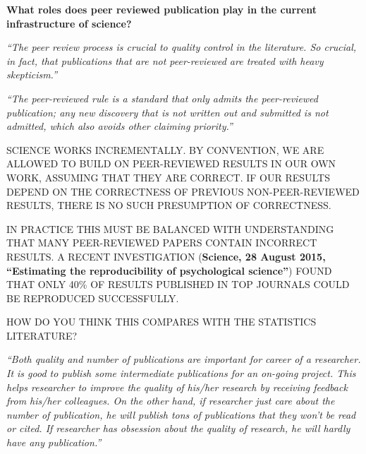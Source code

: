 \documentclass[portrait,11pt]{seminar}
\begin{document}

\es
\bs
{\bf  What roles does peer reviewed publication play in the current infrastructure of science? }

{\it ``The peer review process is crucial to quality control in the literature. So crucial, in fact, that publications that are not peer-reviewed are treated with heavy skepticism.''}

\medskip

{\it ``The peer-reviewed rule is a standard that only admits the peer-reviewed publication; any new discovery that is not written out and submitted is not admitted, which also avoids other claiming priority.''}


\es
\bs

SCIENCE WORKS INCREMENTALLY. BY CONVENTION, WE ARE ALLOWED TO BUILD ON PEER-REVIEWED RESULTS IN OUR OWN WORK, ASSUMING THAT THEY ARE CORRECT. IF OUR RESULTS DEPEND ON THE CORRECTNESS OF PREVIOUS NON-PEER-REVIEWED RESULTS, THERE IS NO SUCH PRESUMPTION OF CORRECTNESS.

\medskip

IN PRACTICE THIS MUST BE BALANCED WITH UNDERSTANDING THAT MANY PEER-REVIEWED PAPERS CONTAIN INCORRECT RESULTS.
A RECENT  INVESTIGATION ({\bf Science, 28 August 2015, ``Estimating the reproducibility of psychological science''}) FOUND THAT ONLY 40\% OF RESULTS PUBLISHED IN TOP JOURNALS COULD BE REPRODUCED SUCCESSFULLY.

\medskip

HOW DO YOU THINK THIS COMPARES WITH THE STATISTICS LITERATURE?

\es 
{}

{\it ``Both quality and number of publications are important for career of a researcher. It is good to publish some intermediate publications for an on-going project. This helps researcher to improve the quality of his/her research by receiving feedback from his/her colleagues. On the other hand, if researcher just care about the number of publication, he will publish tons of publications that they won't be read or cited. If researcher has obsession about the quality of research, he will hardly have any publication.''}
\end{document}
